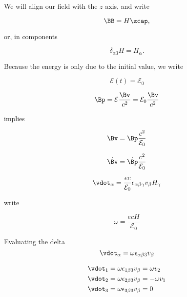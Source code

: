 {We will align our field with the \(z\) axis, and write

\begin{equation}\label{eqn:relativisticElectrodynamicsT3:560}
\BB = H \zcap,
\end{equation}

or, in components

\begin{equation}\label{eqn:relativisticElectrodynamicsT3:580}
\delta_{\alpha 3} H = H_\alpha.
\end{equation}

Because the energy is only due to the initial value, we write

\begin{equation}\label{eqn:relativisticElectrodynamicsT3:540}
\mathcal{E}(t) = \mathcal{E}_0
\end{equation}

\begin{equation}\label{eqn:relativisticElectrodynamicsT3:600}
\Bp = \mathcal{E} \frac{\Bv}{c^2} = \mathcal{E}_0 \frac{\Bv}{c^2}
\end{equation}

implies

\begin{equation}\label{eqn:relativisticElectrodynamicsT3:620}
\Bv = \Bp \frac{c^2}{\mathcal{E}_0}
\end{equation}

\begin{equation}\label{eqn:relativisticElectrodynamicsT3:640}
\dot{\Bv} = \dot{\Bp} \frac{c^2}{\mathcal{E}_0}
\end{equation}

\begin{equation}\label{eqn:relativisticElectrodynamicsT3:660}
\vdot_\alpha = \frac{e c}{\mathcal{E}_0} \epsilon_{\alpha \beta \gamma} v_\beta H_\gamma
\end{equation}

write

\begin{equation}\label{eqn:relativisticElectrodynamicsT3:680}
\omega = \frac{e c H}{\mathcal{E}_0}
\end{equation}

Evaluating the delta 
\begin{equation}\label{eqn:relativisticElectrodynamicsT3:700}
\vdot_\alpha = \omega \epsilon_{\alpha \beta 3} v_\beta
\end{equation}

\begin{equation}\label{eqn:relativisticElectrodynamicsT3:720}
\begin{aligned}
\vdot_1 &= \omega \epsilon_{1 \beta 3} v_\beta = \omega v_2 \\
\vdot_2 &= \omega \epsilon_{2 \beta 3} v_\beta = - \omega v_1 \\
\vdot_3 &= \omega \epsilon_{3 \beta 3} v_\beta = 0
\end{aligned}
\end{equation}

}
